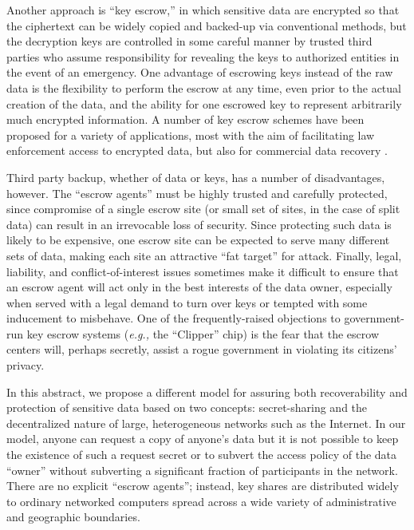 Another approach is ``key escrow,'' in which sensitive data are
encrypted so that the ciphertext can be widely copied and backed-up
via conventional methods, but the decryption keys are controlled in
some careful manner by trusted third parties who assume responsibility
for revealing the keys to authorized entities in the event of an
emergency.  One advantage of escrowing keys instead of the raw data is
the flexibility to perform the escrow at any time, even prior to the
actual creation of the data, and the ability for one escrowed key to
represent arbitrarily much encrypted information.  A number of key
escrow schemes have been proposed for a variety of applications, most
with the aim of facilitating law enforcement access to encrypted data,
but also for commercial data recovery \cite{clipper,tis,denning}.

Third party backup, whether of data or keys, has a number of
disadvantages, however.  The ``escrow agents'' must be highly trusted
and carefully protected, since compromise of a single escrow site (or
small set of sites, in the case of split data) can result in an
irrevocable loss of security.  Since protecting such data is likely to
be expensive, one escrow site can be expected to serve many different
sets of data, making each site an attractive ``fat target'' for
attack.  Finally, legal, liability, and conflict-of-interest issues
sometimes make it difficult to ensure that an escrow agent will act
only in the best interests of the data owner, especially when served
with a legal demand to turn over keys or tempted with some inducement
to misbehave.  One of the frequently-raised objections to
government-run key escrow systems ({\em e.g.,} the ``Clipper'' chip)
is the fear that the escrow centers will, perhaps secretly, assist a
rogue government in violating its citizens' privacy.

In this abstract, we propose a different model for assuring both
recoverability and protection of sensitive data based on two concepts:
secret-sharing and the decentralized nature of large, heterogeneous
networks such as the Internet.  In our model, anyone can request a
copy of anyone's data but it is not possible to keep the existence of
such a request secret or to subvert the access policy of the data
``owner'' without subverting a significant fraction of participants in
the network.  There are no explicit ``escrow agents''; instead, key
shares are distributed widely to ordinary networked computers spread
across a wide variety of administrative and geographic boundaries.

